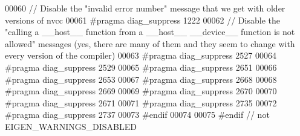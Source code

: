 \begin{DoxyCode}
00060   \textcolor{comment}{// Disable the "invalid error number" message that we get with older versions of nvcc}
00061 \textcolor{preprocessor}{  #pragma diag\_suppress 1222}
00062   \textcolor{comment}{// Disable the "calling a \_\_host\_\_ function from a \_\_host\_\_ \_\_device\_\_ function is not allowed" messages
       (yes, there are many of them and they seem to change with every version of the compiler)}
00063 \textcolor{preprocessor}{  #pragma diag\_suppress 2527}
00064 \textcolor{preprocessor}{  #pragma diag\_suppress 2529}
00065 \textcolor{preprocessor}{  #pragma diag\_suppress 2651}
00066 \textcolor{preprocessor}{  #pragma diag\_suppress 2653}
00067 \textcolor{preprocessor}{  #pragma diag\_suppress 2668}
00068 \textcolor{preprocessor}{  #pragma diag\_suppress 2669}
00069 \textcolor{preprocessor}{  #pragma diag\_suppress 2670}
00070 \textcolor{preprocessor}{  #pragma diag\_suppress 2671}
00071 \textcolor{preprocessor}{  #pragma diag\_suppress 2735}
00072 \textcolor{preprocessor}{  #pragma diag\_suppress 2737}
00073 \textcolor{preprocessor}{#endif}
00074 
00075 \textcolor{preprocessor}{#endif // not EIGEN\_WARNINGS\_DISABLED}
\end{DoxyCode}
